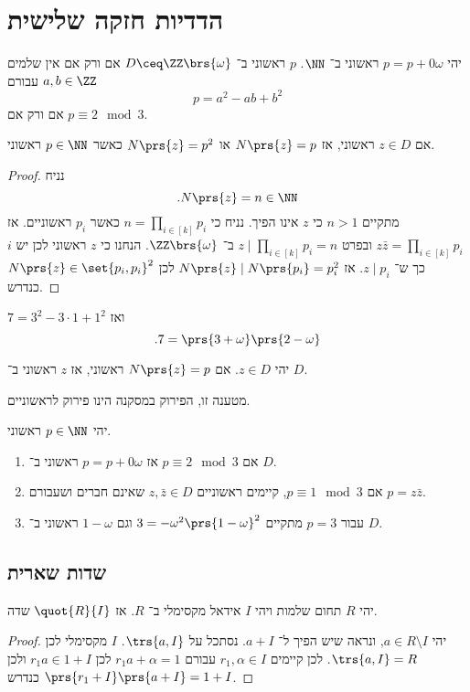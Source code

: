 \documentclass[a4paper,10pt,twoside,openany]{book}
\begin{document}
\chapter{הדדיות חזקה שלישית}

\begin{proposition}
יהי
$p = p + 0\omega$
ראשוני ב־%
$\NN$.
$p$
ראשוני ב־%
$D \ceq \ZZ\brs{\omega}$
אם ורק אם אין שלמים
$a,b \in \ZZ$
עבורם
\[p = a^2 - ab + b^2\]
אם ורק אם
$p \equiv 2 \mod{3}$.
\end{proposition}
\begin{proposition}
אם
$z \in D$
ראשוני, אז
$N\prs{z} = p$
או
$N\prs{z} = p^2$
כאשר
$p \in \NN$
ראשוני.
\end{proposition}

\begin{proof}
נניח
\[\text{.} N\prs{z} = n \in \NN\]
מתקיים
$n > 1$
כי
$z$
אינו הפיך.
נניח כי
$n = \prod_{i\in[k]} p_i$
כאשר
$p_i$
ראשוניים.
אז
$z \bar{z} = \prod_{i \in[k]} p_i$
ובפרט
$z \mid \prod_{i\in[k]} p_i = n$
ב־%
$\ZZ\brs{\omega}$.
הנחנו כי
$z$
ראשוני לכן יש
$i$
כך ש־%
$z \mid p_i$.
אז
$N\prs{z} \mid N\prs{p_i} = p_i^2$
לכן
$N\prs{z} \in \set{p_i, p_i}^2$
כנדרש.
\end{proof}

\begin{example}
$7 = 3^2 - 3\cdot 1 + 1^2$
ואז
\[\text{.} 7 = \prs{3 + \omega}\prs{2-\omega}\]
\end{example}

\begin{proposition}
יהי
$z \in D$.
אם
$N\prs{z} = p$
ראשוני, אז
$z$
ראשוני ב־%
$D$.
\end{proposition}
\begin{remark}
מטענה זו, הפירוק במסקנה הינו פירוק לראשוניים.
\end{remark}

\begin{theorem} \label{Z-omega:properties}
יהי
$p \in \NN$
ראשוני.
\begin{enumerate}
\item
אם
$p \equiv 2 \mod{3}$
אז
$p = p+0\omega$
ראשוני ב־%
$D$.
\item אם
$p \equiv 1 \mod{3}$,
קיימים ראשוניים
$z,\bar{z} \in D$
שאינם חברים ושעבורם
$p = z\bar{z}$.
\item
עבור
$p=3$
מתקיים
$3 = -\omega^2\prs{1-\omega}^2$
וגם
$1-\omega$
ראשוני ב־%
$D$.
\end{enumerate}
\end{theorem}

\section{שדות שארית}
\begin{proposition}
יהי
$R$
תחום שלמות ויהי
$I$
אידאל מקסימלי ב־%
$R$.
אז
$\quot{R}{I}$
שדה.
\end{proposition}
\begin{proof}
יהי
$a \in R \setminus I$,
ונראה שיש הפיך ל־%
$a + I$.
נסתכל על
$\trs{a,I}$.
$I$
מקסימלי לכן
$\trs{a,I} = R$.
לכן קיימים
$r_1,\alpha \in I$
עבורם
$r_1 a + \alpha = 1$
לכן
$r_1 a \in 1 + I$
ולכן
$\prs{r_1 + I}\prs{a + I} = 1 + I$
כנדרש.
\end{proof}
\end{document}
